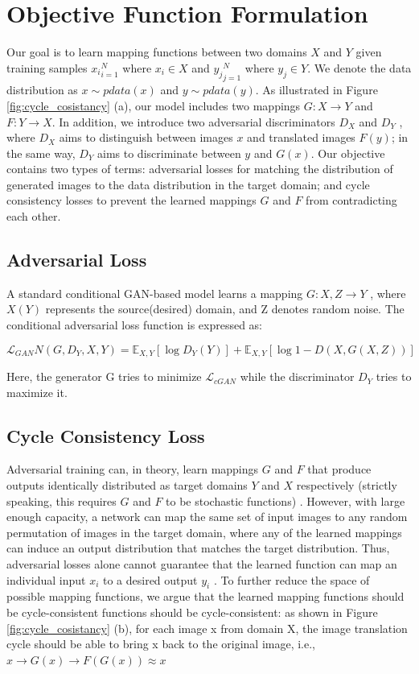 \documentclass[a4paper]{article}
\begin{document}
\section{Objective Function Formulation}
Our goal is to learn mapping functions between two domains $X$ and $Y$ given training samples ${x_i}^N_{i=1}$ where ${x_i} \in X$ and ${y_j}^N_{j=1}$
where ${y_j} \in Y$. We denote the data distribution as $x ∼ pdata(x)$ and
$y ∼ pdata(y)$. As illustrated in Figure \ref{fig:cycle_cosistancy} (a), our model includes two mappings $G : X → Y$ and $F : Y → X$. In addition, we introduce two adversarial discriminators $D_X$ and $D_Y$ , where $D_X$ aims to distinguish between images ${x}$ and translated images ${F(y)}$; in the same way, $D_Y$ aims to discriminate between ${y}$ and ${G(x)}$. Our objective contains two types of terms: adversarial losses \cite{NIPS2014_5ca3e9b1} for matching the distribution of generated images to the data distribution in the target domain; and cycle consistency losses to prevent the learned mappings $G$ and $F$ from contradicting each other.

\subsection{Adversarial Loss}
A standard conditional GAN-based model learns a mapping $G : {X, Z} → Y$ , where $X(Y)$ represents the source(desired) domain, and Z denotes random noise. The conditional adversarial loss function\cite{mirza2014conditional} is expressed as:

\begin{equation}
    \label{eq:advloss}
    \mathcal{L}_{GAN}N(G, D_Y , X, Y ) = \mathbb{E}_{X,Y}[\log{D_Y(Y)}] + \mathbb{E}_{X,Y}[\log{1-D(X, G(X,Z))}]
\end{equation}

Here, the generator G tries to minimize $\mathcal{L}_{cGAN}$ while the discriminator $D_Y$ tries to maximize it.

\subsection{Cycle Consistency Loss}
Adversarial training can, in theory, learn mappings $G$ and $F$ that produce outputs identically distributed as target domains $Y$ and $X$ respectively (strictly speaking, this requires $G$ and $F$ to be stochastic functions) \cite{goodfellow2017nips}. However, with large enough capacity, a network can map the same set of input images to any random permutation of images in the target domain, where any of the learned mappings can induce an output distribution that matches the target distribution. Thus, adversarial losses alone cannot guarantee that the learned function can map an individual input $x_i$ to a desired output $y_i$ . To further reduce the space of possible mapping functions, we argue that the learned mapping functions should be cycle-consistent functions should be cycle-consistent: as shown in Figure \ref{fig:cycle_cosistancy} (b), for each image x from domain X, the image translation cycle should be able to bring x back to the original image, i.e., $x → G(x) → F(G(x)) ≈ x$
\end{document}
